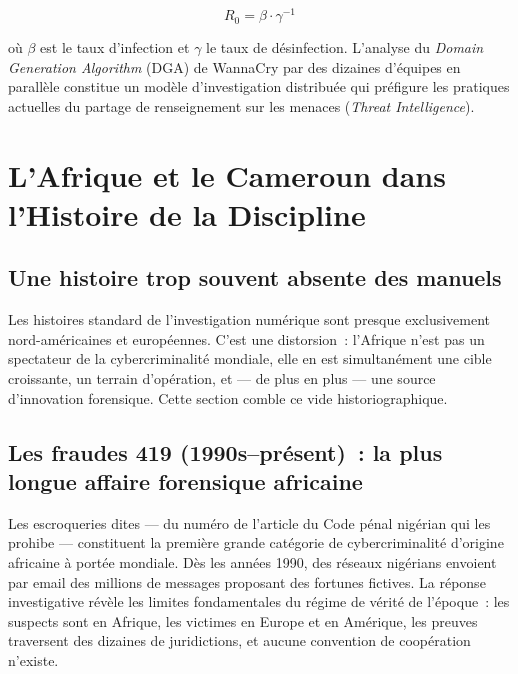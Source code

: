 \begin{equation}
R_0 = \beta \cdot \gamma^{-1}
\label{eq:wannacry-R0}
\end{equation}

où $\beta$ est le taux d'infection et $\gamma$ le taux de désinfection.
L'analyse du \textit{Domain Generation Algorithm} (DGA) de WannaCry par
des dizaines d'équipes en parallèle constitue un modèle d'investigation
distribuée qui préfigure les pratiques actuelles du partage de renseignement
sur les menaces (\textit{Threat Intelligence}).

\section{L'Afrique et le Cameroun dans l'Histoire de la Discipline}

\subsection{Une histoire trop souvent absente des manuels}

Les histoires standard de l'investigation numérique sont presque
exclusivement nord-américaines et européennes. C'est une distorsion~:
l'Afrique n'est pas un spectateur de la cybercriminalité mondiale, elle
en est simultanément une cible croissante, un terrain d'opération, et
--- de plus en plus --- une source d'innovation forensique. Cette section
comble ce vide historiographique.

\subsection{Les fraudes 419 (1990s--présent)~: la plus longue affaire forensique africaine}

Les escroqueries dites  --- du numéro de
l'article du Code pénal nigérian qui les prohibe --- constituent la première
grande catégorie de cybercriminalité d'origine africaine à portée mondiale.
Dès les années 1990, des réseaux nigérians envoient par email des millions de
messages proposant des fortunes fictives. La réponse investigative révèle les
limites fondamentales du régime de vérité de l'époque~: les suspects sont en
Afrique, les victimes en Europe et en Amérique, les preuves traversent des
dizaines de juridictions, et aucune convention de coopération n'existe.

